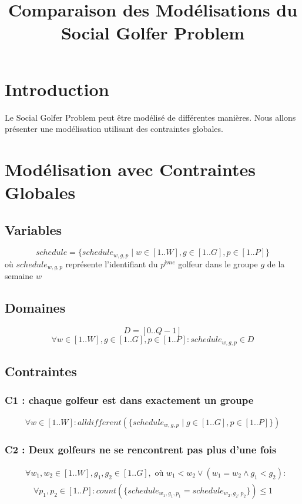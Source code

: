\documentclass{article}
\title{Comparaison des Modélisations du Social Golfer Problem}
\author{}
\date{}
\begin{document}
\maketitle

\section{Introduction}
Le Social Golfer Problem peut être modélisé de différentes manières. Nous allons présenter une modélisation utilisant des contraintes globales.

\section{Modélisation avec Contraintes Globales}

\subsection{Variables}
\[
schedule = \{schedule_{w,g,p} \mid w \in [1..W], g \in [1..G], p \in [1..P]\}
\]
où $schedule_{w,g,p}$ représente l'identifiant du $p^{ème}$ golfeur dans le groupe $g$ de la semaine $w$

\subsection{Domaines}
\[
D = [0..Q-1]
\]
\[
\forall w \in [1..W], g \in [1..G], p \in [1..P] : schedule_{w,g,p} \in D
\]

\subsection{Contraintes}
\subsubsection{C1 : chaque golfeur est dans exactement un groupe }
\[
\forall w \in [1..W] : alldifferent(\{schedule_{w,g,p} \mid g \in [1..G], p \in [1..P]\})
\]

\subsubsection{C2 : Deux golfeurs ne se rencontrent pas plus d'une fois}
\[
\begin{aligned}
&\forall w_1,w_2 \in [1..W], g_1,g_2 \in [1..G], \text{ où } w_1 < w_2 \vee (w_1 = w_2 \wedge g_1 < g_2) : \\
&\quad \forall p_1,p_2 \in [1..P] : count(\{schedule_{w_1,g_1,p_1} = schedule_{w_2,g_2,p_2}\}) \leq 1
\end{aligned}
\]
\end{document}
